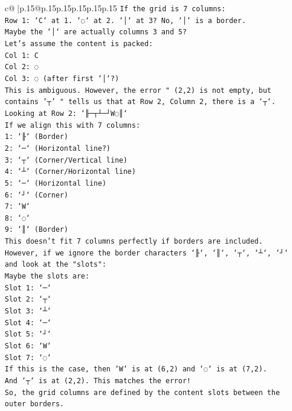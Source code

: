 \documentclass{article}
\begin{document}
{\begin{supertabular}{c@{$\;$}|p{.15\linewidth}@{}p{.15\linewidth}p{.15\linewidth}p{.15\linewidth}p{.15\linewidth}p{.15\linewidth}}
{{{\texttt{If the grid is 7 columns:} \\
\texttt{Row 1: `C` at 1. `◌` at 2. `│` at 3? No, `│` is a border.} \\
\texttt{Maybe the `│` are actually columns 3 and 5?} \\
\texttt{Let's assume the content is packed:} \\
\texttt{Col 1: C} \\
\texttt{Col 2: ◌} \\
\texttt{Col 3: ◌ (after first `│`?)} \\
\texttt{This is ambiguous. However, the error " (2,2) is not empty, but contains '┬' " tells us that at Row 2, Column 2, there is a `┬`.} \\
\texttt{Looking at Row 2: `╟─┬┴─┘W◌║`} \\
\texttt{If we align this with 7 columns:} \\
\texttt{1: `╟` (Border)} \\
\texttt{2: `─` (Horizontal line?)} \\
\texttt{3: `┬` (Corner/Vertical line)} \\
\texttt{4: `┴` (Corner/Horizontal line)} \\
\texttt{5: `─` (Horizontal line)} \\
\texttt{6: `┘` (Corner)} \\
\texttt{7: `W`} \\
\texttt{8: `◌`} \\
\texttt{9: `║` (Border)} \\
\texttt{This doesn't fit 7 columns perfectly if borders are included.} \\
\texttt{However, if we ignore the border characters `╟`, `║`, `┬`, `┴`, `┘` and look at the "slots":} \\
\texttt{Maybe the slots are:} \\
\texttt{Slot 1: `─`} \\
\texttt{Slot 2: `┬`} \\
\texttt{Slot 3: `┴`} \\
\texttt{Slot 4: `─`} \\
\texttt{Slot 5: `┘`} \\
\texttt{Slot 6: `W`} \\
\texttt{Slot 7: `◌`} \\
\texttt{If this is the case, then `W` is at (6,2) and `◌` is at (7,2).} \\
\texttt{And `┬` is at (2,2). This matches the error!} \\
\texttt{So, the grid columns are defined by the content slots between the outer borders.} \\
}}}
\end{supertabular}}
\end{document}
